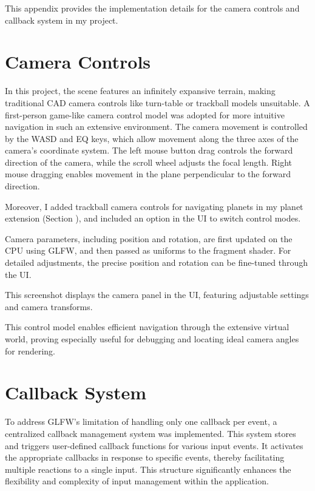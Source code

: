\label{Input Controls}

This appendix provides the implementation details for the camera controls and callback system in my project.

\section{Camera Controls}

In this project, the scene features an infinitely expansive terrain, making traditional CAD camera controls like turn-table or trackball models unsuitable. A first-person game-like camera control model \cite{noauthor_first-person_2024} was adopted for more intuitive navigation in such an extensive environment. The camera movement is controlled by the WASD and EQ keys, which allow movement along the three axes of the camera's coordinate system. The left mouse button drag controls the forward direction of the camera, while the scroll wheel adjusts the focal length. Right mouse dragging enables movement in the plane perpendicular to the forward direction. 

Moreover, I added trackball camera controls \cite{noauthor_object_nodate} for navigating planets in my planet extension (Section ), and included an option in the UI to switch control modes.

Camera parameters, including position and rotation, are first updated on the CPU using GLFW, and then passed as uniforms to the fragment shader. For detailed adjustments, the precise position and rotation can be fine-tuned through the UI.

{This screenshot displays the camera panel in the UI, featuring adjustable settings and camera transforms. }

This control model enables efficient navigation through the extensive virtual world, proving especially useful for debugging and locating ideal camera angles for rendering.

\section{Callback System}

To address GLFW's limitation of handling only one callback per event, a centralized callback management system was implemented. This system stores and triggers user-defined callback functions for various input events. It activates the appropriate callbacks in response to specific events, thereby facilitating multiple reactions to a single input. This structure significantly enhances the flexibility and complexity of input management within the application.